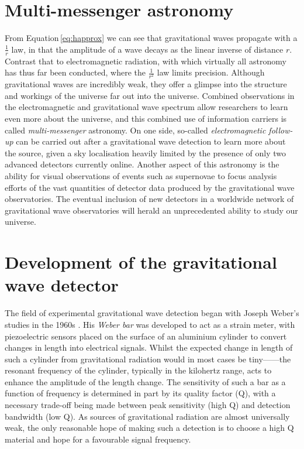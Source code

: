 \section{Multi-messenger astronomy}
From Equation\,\ref{eq:happrox} we can see that gravitational waves propagate with a $\frac{1}{r}$ law, in that the amplitude of a wave decays as the linear inverse of distance $r$. Contrast that to electromagnetic radiation, with which virtually all astronomy has thus far been conducted, where the $\frac{1}{r^2}$ law limits precision. Although gravitational waves are incredibly weak, they offer a glimpse into the structure and workings of the universe far out into the universe. Combined observations in the electromagnetic and gravitational wave spectrum allow researchers to learn even more about the universe, and this combined use of information carriers is called \emph{multi-messenger} astronomy. On one side, so-called \emph{electromagnetic follow-up} can be carried out after a gravitational wave detection to learn more about the source, given a sky localisation heavily limited by the presence of only two advanced detectors currently online. Another aspect of this astronomy is the ability for visual observations of events such as supernovae to focus analysis efforts of the vast quantities of detector data produced by the gravitational wave observatories. The eventual inclusion of new detectors in a worldwide network of gravitational wave observatories will herald an unprecedented ability to study our universe.

\section{Development of the gravitational wave detector}
The field of experimental gravitational wave detection began with Joseph Weber's studies in the 1960s \cite{Weber1960}. His \emph{Weber bar} was developed to act as a strain meter, with piezoelectric sensors placed on the surface of an aluminium cylinder to convert changes in length into electrical signals. Whilst the expected change in length of such a cylinder from gravitational radiation would in most cases be tiny------the resonant frequency of the cylinder, typically in the kilohertz range, acts to enhance the amplitude of the length change. The sensitivity of such a bar as a function of frequency is determined in part by its quality factor (Q), with a necessary trade-off being made between peak sensitivity (high Q) and detection bandwidth (low Q). As sources of gravitational radiation are almost universally weak, the only reasonable hope of making such a detection is to choose a high Q material and hope for a favourable signal frequency.

